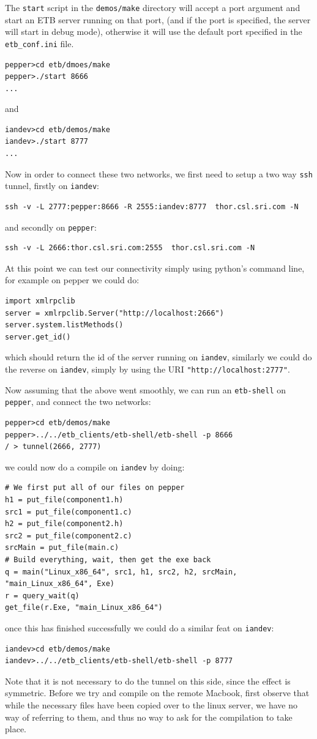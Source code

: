 \documentclass{article}
\begin{document}
The {\tt start} script in the {\tt demos/make} directory will accept
a port argument and start an ETB server running on that port, (and if the port is specified, 
the server will start in debug mode), otherwise it will use the default port specified
in the {\tt etb\_conf.ini} file.
\begin{verbatim}
pepper>cd etb/dmoes/make
pepper>./start 8666
...
\end{verbatim}
and 
\begin{verbatim}
iandev>cd etb/demos/make
iandev>./start 8777
...
\end{verbatim}
Now in order to connect these two networks, we first need to setup a two way {\tt ssh}
tunnel, firstly on {\tt iandev}:

\begin{verbatim}
ssh -v -L 2777:pepper:8666 -R 2555:iandev:8777  thor.csl.sri.com -N
\end{verbatim}
and secondly on {\tt pepper}:

\begin{verbatim}
ssh -v -L 2666:thor.csl.sri.com:2555  thor.csl.sri.com -N
\end{verbatim}

At this point we can test our connectivity simply using python's
command line, for example on pepper we could do:

\begin{verbatim}
import xmlrpclib
server = xmlrpclib.Server("http://localhost:2666")
server.system.listMethods()
server.get_id()
\end{verbatim}

which should return the id of the server running on {\tt iandev}, similarly 
we could do the reverse on {\tt iandev}, simply by using the 
URI {\tt "http://localhost:2777"}.

Now assuming that the above went smoothly, we can run an {\tt etb-shell}
on {\tt pepper}, and connect the two networks:
\begin{verbatim}
pepper>cd etb/demos/make
pepper>../../etb_clients/etb-shell/etb-shell -p 8666
/ > tunnel(2666, 2777)
\end{verbatim}
we could now do a compile on {\tt iandev} by doing:
\begin{verbatim}
# We first put all of our files on pepper
h1 = put_file(component1.h)
src1 = put_file(component1.c)
h2 = put_file(component2.h)
src2 = put_file(component2.c)
srcMain = put_file(main.c)
# Build everything, wait, then get the exe back
q = main("Linux_x86_64", src1, h1, src2, h2, srcMain, "main_Linux_x86_64", Exe)
r = query_wait(q)
get_file(r.Exe, "main_Linux_x86_64")
\end{verbatim}
once this has finished successfully we could do a similar feat on {\tt iandev}:
\begin{verbatim}
iandev>cd etb/demos/make
iandev>../../etb_clients/etb-shell/etb-shell -p 8777
\end{verbatim}
Note that it is not necessary to do the tunnel on this side, since the effect is
symmetric. Before we try and compile on the remote Macbook, first observe
that while the necessary files have been copied over to the linux server,
we have no way of referring to them, and thus no way to ask for the compilation to take place.
\end{document}
